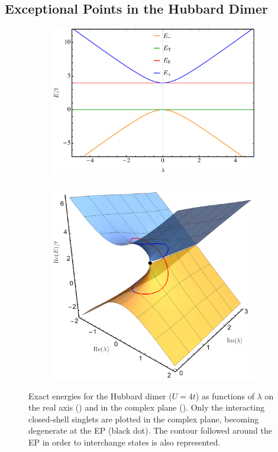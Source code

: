 \documentclass[aps,prb,reprint,noshowkeys,linenumbers,superscriptaddress]{revtex4-1}
\begin{document}
\subsection{Exceptional Points in the Hubbard Dimer}
\label{sec:example}

\begin{figure}[t]
	\begin{subfigure}{0.49\textwidth}
	\includegraphics[height=0.65\textwidth]{fig1a}
	\subcaption{\label{subfig:FCI_real}}
    \end{subfigure}
	\begin{subfigure}{0.49\textwidth}
	\includegraphics[height=0.65\textwidth]{fig1b}
	\subcaption{\label{subfig:FCI_cplx}}
    \end{subfigure}
	\caption{%
	Exact energies for the Hubbard dimer ($U=4t$) as functions of $\lambda$ on the real axis () and in the complex plane ().
    Only the interacting closed-shell singlets are plotted in the complex plane, becoming degenerate at the EP (black dot).
    The contour followed around the EP in order to interchange states is also represented.
	\label{fig:FCI}}
\end{figure}
\end{document}
